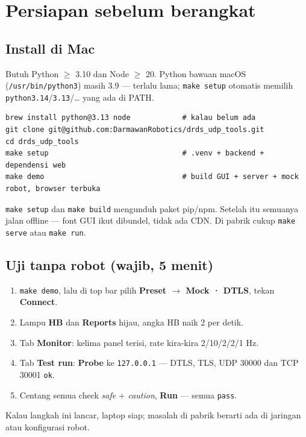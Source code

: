 \documentclass[11pt,a4paper]{article}
\newcommand{\code}[1]{\texttt{#1}}
\newcommand{\ra}{\ensuremath{\rightarrow}}
\newcommand{\ui}[1]{\textbf{#1}}
\begin{document}
\section{Persiapan sebelum berangkat}\label{sec:prep}

\subsection{Install di Mac}
Butuh Python $\geq$ 3.10 dan Node $\geq$ 20. Python bawaan macOS (\code{/usr/bin/python3}) masih 3.9 --- terlalu
lama; \code{make setup} otomatis memilih \code{python3.14}/\code{3.13}/\ldots{} yang ada di PATH.
\begin{lstlisting}
brew install python@3.13 node            # kalau belum ada
git clone git@github.com:DarmawanRobotics/drds_udp_tools.git
cd drds_udp_tools
make setup                               # .venv + backend + dependensi web
make demo                                # build GUI + server + mock robot, browser terbuka
\end{lstlisting}
\begin{warn}
\code{make setup} dan \code{make build} mengunduh paket pip/npm. Setelah itu semuanya jalan offline --- font
GUI ikut dibundel, tidak ada CDN. Di pabrik cukup \code{make serve} atau \code{make run}.
\end{warn}

\subsection{Uji tanpa robot (wajib, 5 menit)}
\begin{enumerate}
\item \code{make demo}, lalu di top bar pilih \ui{Preset \ra{} Mock · DTLS}, tekan \ui{Connect}.
\item Lampu \ui{HB} dan \ui{Reports} hijau, angka HB naik 2 per detik.
\item Tab \ui{Monitor}: kelima panel terisi, rate kira-kira 2/10/2/2/1 Hz.
\item Tab \ui{Test run}: \ui{Probe} ke \code{127.0.0.1} --- DTLS, TLS, UDP 30000 dan TCP 30001 \code{ok}.
\item Centang semua check \emph{safe} + \emph{caution}, \ui{Run} --- semua \code{pass}.
\end{enumerate}
Kalau langkah ini lancar, laptop siap; masalah di pabrik berarti ada di jaringan atau konfigurasi robot.
\end{document}
